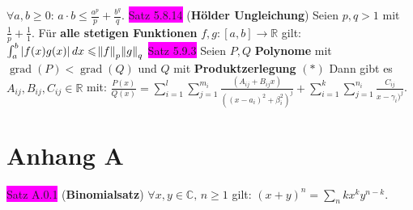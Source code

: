 \documentclass[landscape, 10pt]{article}
\newcommand{\R}{\mathbb{R}}
\newcommand{\C}{\mathbb{C}}
\begin{document}
\begin{multicols}{3}
                     \textcolor{NavyBlue}{$\forall a,b\geqslant0$}: 
                     \textcolor{NavyBlue}{$a\cdot b\leqslant\frac{a^p}{p}+\frac{b^q}{q}$}.
              \colorbox{magenta}{Satz 5.8.14} (\textbf{Hölder Ungleichung}) Seien 
                     \textcolor{NavyBlue}{$p,q>1$} mit 
                     \textcolor{NavyBlue}{$\frac{1}{p}+\frac{1}{1}$}. Für 
                     \textbf{alle stetigen Funktionen} 
                     \textcolor{NavyBlue}{$f,g:[a,b]\longrightarrow\R$} gilt: 
                     \textcolor{NavyBlue}{$\int_a^b|f(x)g(x)|\,dx\leqslant\norm{f}_p\norm{g}_q$}
              \colorbox{magenta}{Satz 5.9.3} Seien \textcolor{NavyBlue}{$P,Q$} \textbf{Polynome} mit 
                     \textcolor{NavyBlue}{$\operatorname{grad}(P)<\operatorname{grad}(Q)$} und 
                     \textcolor{NavyBlue}{$Q$}
                     mit \textbf{Produktzerlegung} $(*)$ Dann gibt es 
                     \textcolor{NavyBlue}{$A_{ij},B_{ij},C_{ij}\in\R$} mit: 
                     \textcolor{NavyBlue}{$\frac{P(x)}{Q(x)}
                     =\sum_{i=1}^l\sum_{j=1}^{m_i}
                     \frac{(A_{ij}+B_{ij}x)}{((x-a_i)^2+\beta_i^2)^j}
                     +\sum_{i=1}^k\sum_{j=1}^{n_i}\frac{C_{ij}}{x-\gamma_i)^j}$}.


\section{Anhang A}
              \colorbox{magenta}{Satz A.0.1} (\textbf{Binomialsatz}) 
                     \textcolor{NavyBlue}{$\forall x,y\in\C,\,n\geqslant1$} gilt: 
                     \textcolor{NavyBlue}{$(x+y)^n=\sum_{n}{k}x^ky^{n-k}$}.



\end{multicols}
\end{document}
